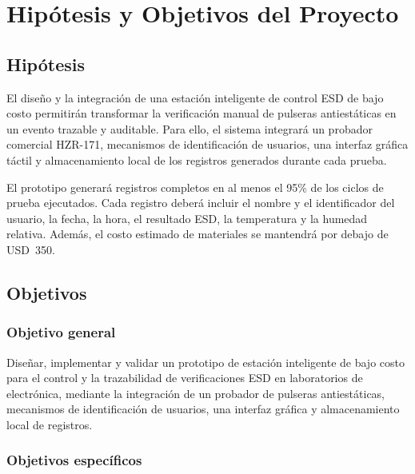 \chapter{Hipótesis y Objetivos del Proyecto}

\section{Hipótesis}

El diseño y la integración de una estación inteligente de control ESD de bajo
costo permitirán transformar la verificación manual de pulseras antiestáticas en
un evento trazable y auditable. Para ello, el sistema integrará un probador
comercial HZR-171, mecanismos de identificación de usuarios, una interfaz
gráfica táctil y almacenamiento local de los registros generados durante cada
prueba.

El prototipo generará registros completos en al menos el 95\% de los ciclos de
prueba ejecutados. Cada registro deberá incluir el nombre y el identificador del
usuario, la fecha, la hora, el resultado ESD, la temperatura y la humedad relativa.
Además, el costo estimado de materiales se mantendrá por debajo de USD~350.

\section{Objetivos}

\subsection{Objetivo general}

Diseñar, implementar y validar un prototipo de estación inteligente de bajo
costo para el control y la trazabilidad de verificaciones ESD en laboratorios de
electrónica, mediante la integración de un probador de pulseras antiestáticas,
mecanismos de identificación de usuarios, una interfaz gráfica y almacenamiento
local de registros.

\subsection{Objetivos específicos}

